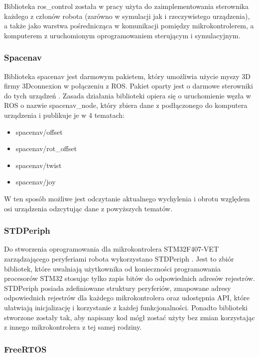 \documentclass[a4paper, 12pt, twoside]{article}
\begin{document}
Biblioteka ros\_control została w pracy użyta do zaimplementowania sterownika każdego z członów robota (zarówno w symulacji jak i rzeczywistego urządzenia), a także jako warstwa pośrednicząca w komunikacji pomiędzy mikrokontrolerem, a komputerem z uruchomionym oprogramowaniem sterującym i symulacyjnym.

\subsubsection{Spacenav}

Biblioteka spacenav \cite{spacenav} jest darmowym pakietem, który umożliwia użycie myszy 3D firmy 3Dconnexion w połączeniu z ROS. Pakiet oparty jest o darmowe sterowniki do tych urządzeń \cite{spacenavdriver}. Zasada działania biblioteki opiera się o uruchomienie węzła w ROS o nazwie spacenav\_node, który zbiera dane z podłączonego do komputera urządzenia i publikuje je w 4 tematach:

\begin{itemize}
\item spacenav/offset
\item spacenav/rot\_offset
\item spacenav/twist
\item spacenav/joy
\end{itemize}

W ten sposób możliwe jest odczytanie aktualnego wychylenia i obrotu względem osi urządzenia odzcytując dane z powyższych tematów.

\subsubsection{STDPeriph}

Do stworzenia oprogramowania dla mikrokontrolera STM32F407-VET zarządzającego peryferiami robota wykorzystano STDPeriph \cite{stdperiph}. Jest to zbiór bibliotek, które uwalniają użytkownika od konieczności programowania procesorów STM32 stosując tylko zapis bitów do odpowiednich adresów rejestrów. STDPeriph posiada zdefiniowane struktury peryferiów, zmapowane adresy odpowiednich rejestrów dla każdego mikrokontrolera oraz udostępnia API, które ułatwiają inicjalizację i korzystanie z każdej funkcjonalności. Ponadto biblioteki stworzone zostały tak, aby napisany kod mógł zostać użyty bez zmian korzystając z innego mikrokontrolera z tej samej rodziny.

\subsubsection{FreeRTOS}
\end{document}
